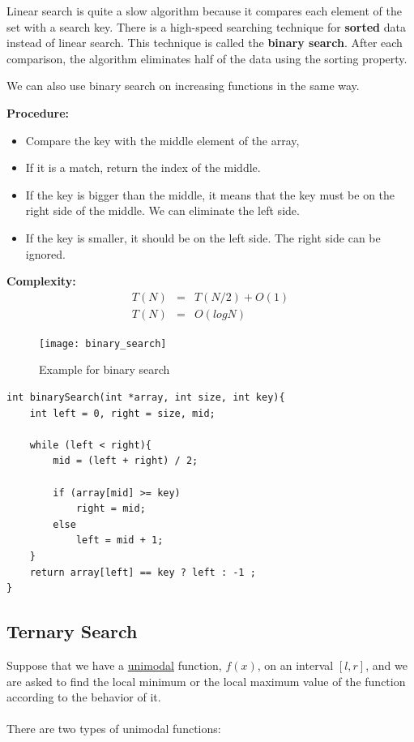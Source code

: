 \documentclass[12pt]{article}
\begin{document}
Linear search is quite a slow algorithm because it compares each element of the set with a search key. There is a high-speed searching technique for \textbf{sorted} data instead of linear search. This technique is called the \textbf{binary search}. After each comparison, the algorithm eliminates half of the data using the sorting property. 

We can also use binary search on increasing functions in the same way. 

\textbf{Procedure: }
\begin{itemize}
	\item Compare the key with the middle element of the array,
	\item If it is a match, return the index of the middle.
	\item If the key is bigger than the middle, it means that the key must be on the right side of the middle. We can eliminate the left side.
	\item If the key is smaller, it should be on the left side. The right side can be ignored.
\end{itemize}	

\textbf{Complexity: }
\begin{eqnarray*}
T(N) &=& T(N / 2) + O(1) \\
T(N) &=& O(logN)
\end{eqnarray*}


\begin{figure}[h]
	\centering
	\texttt{[image: binary\_search]}
	\caption{Example for binary search}
	\label{fig:binary_search}
\end{figure}

\cleardoublepage

\begin{verbatim}
int binarySearch(int *array, int size, int key){
    int left = 0, right = size, mid;

    while (left < right){
        mid = (left + right) / 2;

        if (array[mid] >= key)
            right = mid;
        else
            left = mid + 1;
    }
    return array[left] == key ? left : -1 ;
}
\end{verbatim}

				\cleardoublepage
		\subsection{Ternary Search}

Suppose that we have a \href{https://www.geeksforgeeks.org/mathematics-unimodal-functions-bimodal-functions/}{unimodal} function, $f(x)$, on an interval $[l, r]$, and we are asked to find the local minimum or the local maximum value of the function according to the behavior of it. \\ \\
There are two types of unimodal functions:
\end{document}
